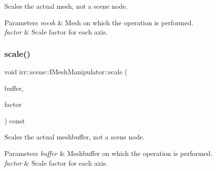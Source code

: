 Scales the actual mesh, not a scene node. 


\begin{DoxyParams}{Parameters}
{\em mesh} & Mesh on which the operation is performed. \\
\hline
{\em factor} & Scale factor for each axis. \\
\hline
\end{DoxyParams}
\mbox{\label{classirr_1_1scene_1_1IMeshManipulator_a6aa8b1bd153c7e524e8200988078282f}} 
\subsubsection{\texorpdfstring{scale()}{scale()}\hspace{0.1cm}{\footnotesize\ttfamily [2/2]}}
{\footnotesize\ttfamily void irr\+::scene\+::\+I\+Mesh\+Manipulator\+::scale (\begin{DoxyParamCaption}\item[{\hyperlink{classirr_1_1scene_1_1IMeshBuffer}{I\+Mesh\+Buffer} $\ast$}]{buffer,  }\item[{const \hyperlink{namespaceirr_1_1core_a06f169d08b5c429f5575acb7edbad811}{core\+::vector3df} \&}]{factor }\end{DoxyParamCaption}) const\hspace{0.3cm}{\ttfamily [inline]}}



Scales the actual meshbuffer, not a scene node. 


\begin{DoxyParams}{Parameters}
{\em buffer} & Meshbuffer on which the operation is performed. \\
\hline
{\em factor} & Scale factor for each axis. \\
\hline
\end{DoxyParams}
\mbox{\label{classirr_1_1scene_1_1IMeshManipulator_a00f8ef80adfd5bb15644b64e8cd9f55e}} 
